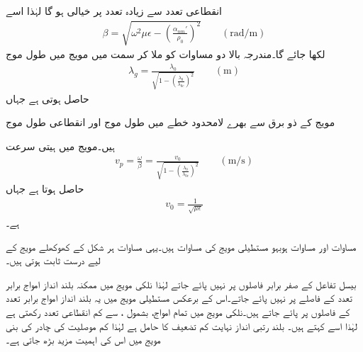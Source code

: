 انقطاعی تعدد سے زیادہ تعدد پر  خیالی ہو گا لہٰذا اسے
\begin{align}
\beta=\sqrt{\omega^2 \mu\epsilon-\left(\frac{\alpha_{nm}'}{\rho_0}\right)^2} \quad \quad (\si{\radian/\meter})
\end{align}
لکھا جائے گا۔مندرجہ بالا دو مساوات کو ملا کر  سمت میں مویج میں طول موج
\begin{align}\label{مساوات_مویج_نلکی_طول_موج}
\lambda_g=\frac{\lambda_0}{\sqrt{1-\left(\frac{\lambda_0}{\lambda_{0c}}\right)^2}} \quad \quad (\si{\meter})
\end{align}
حاصل ہوتی ہے جہاں
\begin{description}
 مویج کے ذو برق سے بھرے لامحدود خطے میں طول موج اور
 انقطاعی طول موج
\end{description}
ہیں۔مویج میں ہیتی سرعت 
\begin{align}\label{مساوات_مویج_نلکی_دوری_رفتار}
v_p=\frac{\omega}{\beta}=\frac{v_0}{\sqrt{1-\left(\frac{\lambda_0}{\lambda_{0c}}\right)^2}} \quad \quad (\si{\meter \per \second})
\end{align}
حاصل ہوتا ہے جہاں
\begin{align*}
v_0=\frac{1}{\sqrt{\mu \epsilon}}
\end{align*}
ہے۔

مساوات  اور مساوات  ہوبہو مستطیلی مویج کی مساوات ہیں۔یہی مساوات ہر شکل کے کھوکھلے مویج کے لیے درست ثابت ہوتی ہیں۔ 

بیسل تفاعل کے صفر برابر فاصلوں پر نہیں پائے جاتے لہٰذا نلکی مویج میں ممکنہ بلند انداز امواج برابر تعدد کے فاصلے پر نہیں پائے جاتے۔اس کے برعکس مستطیلی مویج میں یہ بلند انداز امواج برابر تعدد کے فاصلوں پر پائے جاتے ہیں۔نلکی مویج میں  تمام امواج، بشمول ، سے کم انقطاعی تعدد رکھتی ہے لہٰذا اسے   کہتے ہیں۔ بلند رتبی انداز نہایت کم  تضعیف کا حامل ہے لہٰذا کم موصلیت کی چادر کی بنی مویج میں اس کی اہمیت مزید بڑھ جاتی ہے۔

